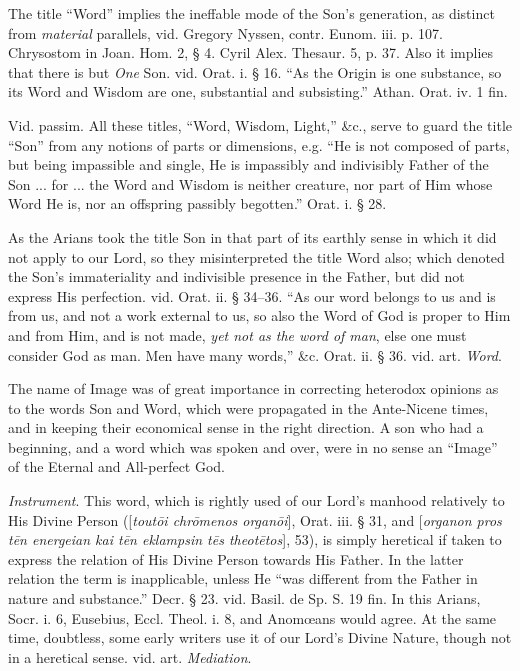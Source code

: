 The title ``Word'' implies the ineffable mode of
the Son's generation, as distinct from \emph{material} parallels, vid.
Gregory Nyssen, contr. Eunom. iii. p. 107. Chrysostom in Joan. Hom. 2,
§ 4. Cyril Alex. Thesaur. 5, p. 37. Also it implies that there is but
\emph{One} Son. vid. Orat. i. § 16. ``As the Origin is one substance,
so its Word and Wisdom are one, substantial and subsisting.'' Athan.
Orat. iv. 1 fin.

Vid. passim. All these titles, ``Word, Wisdom,
Light,'' \&c., serve to guard the title ``Son'' from any notions of
parts or dimensions, e.g. ``He is not composed of parts, but being
impassible and single, He is impassibly and indivisibly Father of the
Son ... for ... the Word and Wisdom is neither creature, nor part of
Him whose Word He is, nor an offspring passibly begotten.'' Orat. i. §
28.

As the Arians took the title Son in that part of
its earthly sense in which it did not apply to our Lord, so they
misinterpreted the title Word also; which denoted the Son's
immateriality and indivisible presence in the Father, but did not
express His perfection. vid. Orat. ii. § 34–36. ``As our word
belongs to us and is from us, and not a work external to us, so also
the Word of God is proper to Him and from Him, and is not made, \emph{yet
not as the word of man}, else one must consider God as man. Men
have many words,'' \&c. Orat. ii. § 36. vid. art. \emph{Word}.

The name of Image was of great importance in
correcting heterodox opinions as to the words Son and Word, which were
propagated in the Ante-Nicene times, and in keeping their economical
sense in the right direction. A son who had a beginning, and a word
which was spoken and over, were in no sense an ``Image'' of the Eternal
and All-perfect God.

\xsection{[Organon]}

\emph{Instrument}. This word, which is rightly
used of our Lord's manhood relatively to His Divine Person ([\emph{tout\={o}i
chr\={o}menos organ\={o}i}], Orat. iii. § 31, and [\emph{organon
pros t\={e}n energeian kai t\={e}n eklampsin t\={e}s theot\={e}tos}],
53), is simply heretical if taken to express the relation of His
Divine Person towards His Father. In the latter relation the term is
inapplicable, unless He ``was different from the Father in nature and
substance.'' Decr. § 23. vid. Basil. de Sp. S. 19 fin. In this Arians,
Socr. i. 6, Eusebius, Eccl. Theol. i. 8, and Anomœans would agree. At
the same time, doubtless, some early writers use it of our Lord's
Divine Nature, though not in a heretical sense. vid. art. \emph{Mediation}.

